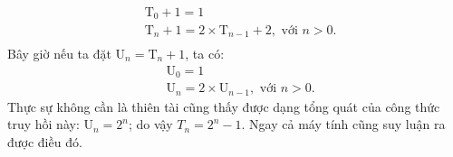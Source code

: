 \begin{equation*}
    \begin{aligned}
        & \mathrm{T}_0 + 1 = 1 \\
        & \mathrm{T}_n + 1 = 2 \times \mathrm{T}_{n - 1} + 2, \text{ \ \ \ \ với } n > 0. \\ 
    \end{aligned}
\end{equation*}
Bây giờ nếu ta đặt $\mathrm{U}_n = \mathrm{T}_n + 1$, ta có:
\begin{equation}\label{1.3}
    \begin{aligned}
        & \mathrm{U}_0 = 1 \\
        & \mathrm{U}_n = 2 \times \mathrm{U}_{n - 1}, \text{ \ \ \ \ với } n > 0.
    \end{aligned}
\end{equation}
Thực sự không cần là thiên tài cũng thấy được dạng tổng quát của công thức truy hồi này: $\mathrm{U}_n = 2^n$; do vậy $T_n = 2^n - 1$. Ngay cả máy tính cũng suy luận ra được điều đó.